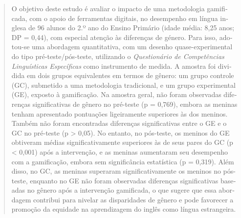 \documentclass[spanish]{textolivre}
\begin{document}
\begin{polyabstract}
\begin{portuguese}
\begin{abstract}
O objetivo deste estudo é avaliar o impacto de uma metodologia gamificada, com o apoio de ferramentas digitais, no desempenho em língua inglesa de 96 alunos do 2.º ano do Ensino Primário (idade média: 8,25 anos; DP = 0,44), com especial atenção às diferenças de género. Para isso, adotou-se uma abordagem quantitativa, com um desenho quase-experimental do tipo pré-teste/pós-teste, utilizando o \textit{Questionário de Competências Linguísticas Específicas} como instrumento de medida. A amostra foi dividida em dois grupos equivalentes em termos de gênero: um grupo controle (GC), submetido a uma metodologia tradicional, e um grupo experimental (GE), exposto à gamificação. Na amostra geral, não foram observadas diferenças significativas de gênero no pré-teste (p = 0,769), embora as meninas tenham apresentado pontuações ligeiramente superiores às dos meninos. Também não foram encontradas diferenças significativas entre o GE e o GC no pré-teste (p > 0,05). No entanto, no pós-teste, os meninos do GE obtiveram médias significativamente superiores às de seus pares do GC (p < 0,001) após a intervenção, e as meninas aumentaram seu desempenho com a gamificação, embora sem significância estatística (p = 0,319). Além disso, no GC, as meninas superaram significativamente os meninos no pós-teste, enquanto no GE não foram observadas diferenças significativas baseadas no gênero após a intervenção gamificada, o que sugere que essa abordagem contribui para nivelar as disparidades de gênero e pode favorecer a promoção da equidade na aprendizagem do inglês como língua estrangeira.
\end{abstract}
\end{portuguese}


\end{polyabstract}
\end{document}
